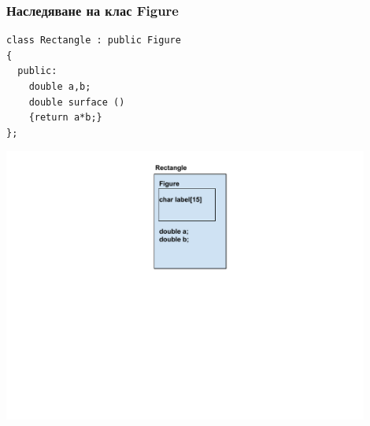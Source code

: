 \documentclass{beamer}
\begin{document}
\begin{frame}[fragile]
\frametitle{Наследяване на клас Figure}


\begin{flushleft}
\begin{lstlisting}
class Rectangle : public Figure
{
  public:
    double a,b;
    double surface ()
    {return a*b;}
};
\end{lstlisting}
\end{flushleft}


\begin{center}
\includegraphics[width=12.0cm]{images/inmem_rectangle}
\end{center}


\end{frame}
\end{document}
